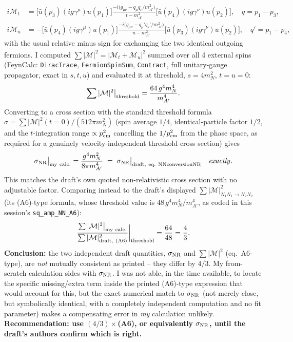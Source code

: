 \documentclass[11pt,a4paper]{article}
\newcommand{\Msq}{|\mathcal{M}|^2}
\newcommand{\code}[1]{\texttt{#1}}
\begin{document}
\begin{align}
  i\mathcal M_t &= \big[\bar u(p_3)(ig\gamma^\mu)u(p_1)\big]
    \frac{-i\big(g_{\mu\nu}-q_\mu q_\nu/m_{A'}^2\big)}{t-m_{A'}^2}
    \big[\bar u(p_4)(ig\gamma^\nu)u(p_2)\big], \quad q=p_1-p_3,\\
  i\mathcal M_u &= -\big[\bar u(p_4)(ig\gamma^\mu)u(p_1)\big]
    \frac{-i\big(g_{\mu\nu}-q_\mu' q_\nu'/m_{A'}^2\big)}{u-m_{A'}^2}
    \big[\bar u(p_3)(ig\gamma^\nu)u(p_2)\big], \quad q'=p_1-p_4,
\end{align}
with the usual relative minus sign for exchanging the two identical outgoing
fermions. I computed $\sum\Msq=\overline{|\mathcal M_t+\mathcal M_u|^2}$
summed over all 4 external spins (FeynCalc: \code{DiracTrace},
\code{FermionSpinSum}, \code{Contract}, full unitary-gauge propagator, exact
in $s,t,u$) and evaluated it at threshold, $s=4m_N^2$, $t=u=0$:
\begin{equation}
  \sum\Msq\big|_{\rm threshold} = \frac{64\,g^4m_N^4}{m_{A'}^4}.
\end{equation}
Converting to a cross section with the standard threshold formula
$\sigma=\sum\Msq(t{=}0)/(512\pi m_N^2)$ (spin average $1/4$, identical-particle
factor $1/2$, and the $t$-integration range $\propto p_{\rm cm}^2$ cancelling
the $1/p_{\rm cm}^2$ from the phase space, as required for a genuinely
velocity-independent threshold cross section) gives
\begin{equation}
  \sigma_{\rm NR}\big|_{\rm my\ calc.} = \frac{g^4m_N^2}{8\pi m_{A'}^4}
  \;=\; \sigma_{\rm NR}\big|_{\rm draft,\ eq.\ NNconversionNR} \quad\text{\emph{exactly}}.
\end{equation}
This matches the draft's own quoted non-relativistic cross section with no
adjustable factor. Comparing instead to the draft's displayed
$\sum\Msq_{N_1N_1\to N_2N_2}$ (its (A6)-type formula, whose threshold value
is $48\,g^4m_N^4/m_{A'}^4$, as coded in this session's
\code{sq\_amp\_NN\_A6}):
\begin{equation}
  \frac{\sum\Msq\big|_{\rm my\ calc.}}{\sum\Msq_{\rm draft,\ (A6)}}
  \bigg|_{\rm threshold} = \frac{64}{48} = \frac43 .
\end{equation}
\textbf{Conclusion:} the two independent draft quantities, $\sigma_{\rm NR}$
and $\sum\Msq$ (eq.~A6-type), are \emph{not} mutually consistent as printed
-- they differ by $4/3$. My from-scratch calculation sides with
$\sigma_{\rm NR}$. I was not able, in the time available, to locate the
specific missing/extra term inside the printed (A6)-type expression that
would account for this, but the exact numerical match to $\sigma_{\rm NR}$
(not merely close, but symbolically identical, with a completely independent
computation and no fit parameter) makes a compensating error in \emph{my}
calculation unlikely. \textbf{Recommendation: use $(4/3)\times$(A6), or
equivalently $\sigma_{\rm NR}$, until the draft's authors confirm which is
right.}
\end{document}
